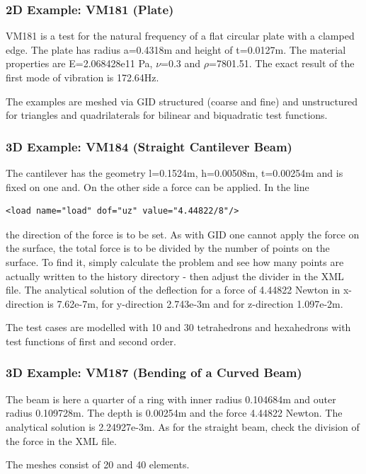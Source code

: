 \documentclass[a4paper,10pt]{article}
\begin{document}
\subsubsection*{2D Example: VM181 (Plate)}
VM181 is a test for the natural frequency of a flat circular plate with a clamped edge. The plate has radius a=0.4318m and height of t=0.0127m. The material properties are E=2.068428e11 Pa, $\nu$=0.3 and $\rho$=7801.51. The exact result of the first mode of vibration is 172.64Hz.

The examples are meshed via GID structured (coarse and fine) and unstructured for triangles and quadrilaterals for bilinear and biquadratic test functions.

\subsubsection*{3D Example: VM184 (Straight Cantilever Beam)}
The cantilever has the geometry l=0.1524m, h=0.00508m, t=0.00254m and is fixed on one and. On the other side a force can be applied. In the line
\begin{verbatim}
<load name="load" dof="uz" value="4.44822/8"/>
\end{verbatim}
the direction of the force is to be set. As with GID one cannot apply the force on the surface, the total force is to be divided by the number of points on the surface. To find it,
simply calculate the problem and see how many points are actually written to the history directory - then adjust the divider in the XML file. The analytical solution of the deflection for a force of 4.44822 Newton in x-direction is 7.62e-7m, for y-direction 2.743e-3m and for z-direction 1.097e-2m. 

The test cases are modelled with 10 and 30 tetrahedrons and hexahedrons with test functions of first and second order.

\subsubsection*{3D Example: VM187 (Bending of a Curved Beam)}
The beam is here a quarter of a ring with inner radius 0.104684m and outer radius 0.109728m. The depth is 0.00254m and the force 4.44822 Newton. The analytical solution is 2.24927e-3m. As for the straight beam, check the division of the force in the XML file.

The meshes consist of 20 and 40 elements.
\end{document}
